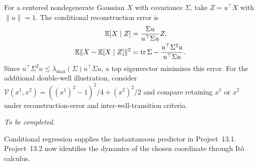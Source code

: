 \documentclass[12pt,a4paper,oneside]{book}
\begin{document}
\begin{remark}
For a centered nondegenerate Gaussian $X$ with covariance $\Sigma$,
take $Z=u^\top X$ with $\|u\|=1$. The conditional reconstruction error is
\begin{equation*}
\begin{aligned}
 \mathbb{E}[X\mid Z]&=\frac{\Sigma u}{u^\top\Sigma u}Z,\\
 \mathbb{E}\|X-\mathbb{E}[X\mid Z]\|^2
 &=\operatorname{tr}\Sigma-
   \frac{u^\top\Sigma^2u}{u^\top\Sigma u}.
\end{aligned}
\end{equation*}
Since $u^\top\Sigma^2u\le\lambda_{\max}(\Sigma)u^\top\Sigma u$,
a top eigenvector minimizes this error.
For the additional double-well illustration, consider
$\mathcal V(x^1,x^2)=((x^1)^2-1)^2/4+(x^2)^2/2$ and compare retaining $x^1$ or $x^2$
under reconstruction-error and inter-well-transition criteria.

\noindent\textit{To be completed.}
\end{remark}

Conditional regression supplies the instantaneous predictor in Project~13.1.
Project~13.2 now identifies the dynamics of the chosen coordinate through
It\^o calculus.
\end{document}
